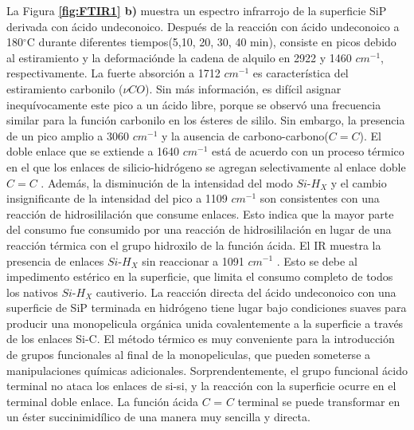 \documentclass[a4paper,11pt,]{book}
\newcommand{\grad}{$^{\circ}$}
\begin{document}
La Figura \textbf{\ref{fig:FTIR1} b)} muestra un espectro infrarrojo de la superficie SiP derivada con ácido undeconoico. Después de la reacción con ácido undeconoico a 180\grad C durante diferentes tiempos(5,10, 20, 30, 40 min), consiste en picos debido al estiramiento y la deformaciónde la cadena de alquilo en 2922 y 1460 $cm^{-1}$, respectivamente. La fuerte absorción a 1712 $cm^{-1}$  es característica del estiramiento carbonilo ($\nu CO$). Sin más información, es difícil asignar inequívocamente este pico a un ácido libre, porque se observó una frecuencia similar para la función carbonilo en los ésteres de sililo\cite{UA1, UA2}.  Sin embargo, la presencia de un pico amplio a 3060 $cm^{-1}$  y la ausencia de carbono-carbono($C=C$).   El doble enlace que se extiende a 1640 $cm^{-1}$  está de acuerdo con un proceso térmico en el que los enlaces de silicio-hidrógeno se agregan selectivamente al enlace doble $C=C$ . Además, la disminución de la intensidad del modo  $Si$-$H_X$  y el cambio insignificante de la intensidad del pico a 1109 $cm^{-1}$ son consistentes con una reacción de hidrosililación que consume enlaces. Esto indica que la mayor parte del consumo fue consumido por una reacción de hidrosililación en lugar de una reacción térmica con el grupo hidroxilo de la función ácida. El IR muestra la presencia de enlaces $Si$-$H_X$ sin reaccionar a 1091 $cm^{-1}$ . Esto se debe al impedimento estérico en la superficie, que limita el consumo completo de todos los nativos $Si$-$H_X$ cautiverio.
La reacción directa del ácido undeconoico con una superficie de SiP terminada en hidrógeno tiene lugar bajo condiciones suaves para producir una monopelicula orgánica unida covalentemente a la superficie a través de los enlaces Si-C. El método térmico es muy conveniente para la introducción de grupos funcionales al final de la monopeliculas, que pueden someterse a manipulaciones químicas adicionales. Sorprendentemente, el grupo funcional ácido terminal no ataca los enlaces de si-si, y la reacción con la superficie ocurre en el terminal  doble enlace. La función ácida
$C$ = $C$ terminal se puede transformar en un éster succinimidílico de una manera muy sencilla y directa.
\end{document}
